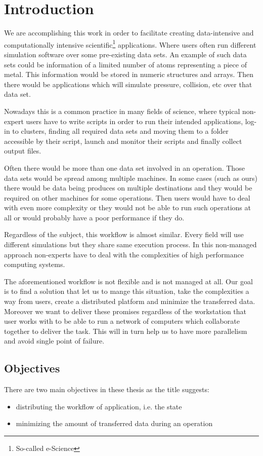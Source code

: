 \chapter{Introduction}
\label{cha:introduction}

We are accomplishing this work in order to facilitate creating data-intensive and computationally intensive 
scientific\footnote{So-called e-Science} applications.
Where users often run different simulation software over some pre-existing data sets.
An example of such data sets could be information of a limited number of atoms representing a piece of metal. 
This information would be stored in numeric structures and arrays.
Then there would be applications which will simulate pressure, collision, etc over that data set.

Nowadays this is a common practice in many fields of science, 
where typical non-expert users have to write scripts in order to run their intended applications,
log-in to clusters, finding all required data sets and moving them to a folder
accessible by their script, launch and monitor their scripts and finally collect output files.

Often there would be more than one data set involved in an operation. 
Those data sets would be spread among multiple machines. 
In some cases (such as ours) there would be data being produces on multiple destinations and
they would be required on other machines for some operations.
Then users would have to deal with even more complexity or they would not be able to run
such operations at all or would probably have a poor performance if they do.

Regardless of the subject, this workflow is almost similar. 
Every field will use different simulations but they share same execution process.
In this non-managed approach non-experts have to deal with the complexities of high performance computing systems.

The aforementioned workflow is not flexible and is not managed at all. 
Our goal is to find a solution that let us to mange this situation, 
take the complexities a way from users, create a distributed platform and minimize the transferred data.
Moreover we want to deliver these promises regardless of the workstation that user works with to be
able to run a network of computers which collaborate together to deliver the task. 
This will in turn help us to have more parallelism and avoid single point of failure.

\section{Objectives}
There are two main objectives in these thesis as the title suggests:
\begin{itemize}
\item distributing the workflow of application, i.e. the state
\item minimizing the amount of transferred data during an operation
\end{itemize}

